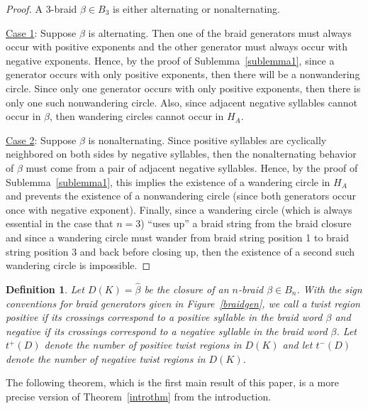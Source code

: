 \documentclass{article}
\newtheorem{definition}{Definition}[section]
\begin{document}
\begin{proof} A 3-braid $\beta \in B_{3}$ is either alternating or nonalternating. 

\bigskip

\noindent \underline{Case 1}: Suppose $\beta$ is alternating. Then one of the braid generators must always occur with positive exponents and the other generator must always occur with negative exponents. Hence, by the proof of Sublemma~\ref{sublemma1}, since a generator occurs with only positive exponents, then there will be a nonwandering circle. Since only one generator occurs with only positive exponents, then there is only one such nonwandering circle. Also, since adjacent negative syllables cannot occur in $\beta$, then wandering circles cannot occur in $H_{A}$. 

\bigskip

\noindent \underline{Case 2}: Suppose $\beta$ is nonalternating. Since positive syllables are cyclically neighbored on both sides by negative syllables, then the nonalternating behavior of $\beta$ must come from a pair of adjacent negative syllables. Hence, by the proof of Sublemma~\ref{sublemma1}, this implies the existence of a wandering circle in $H_{A}$ and prevents the existence of a nonwandering circle (since both generators occur once with negative exponent). Finally, since a wandering circle (which is always essential in the case that $n=3$) ``uses up'' a braid string from the braid closure and since a wandering circle must wander from braid string position 1 to braid string position 3 and back before closing up, then the existence of a second such wandering circle is impossible. 

\end{proof}

\begin{definition}
Let $D(K)=\widehat{\beta}$ be the closure of an $n$-braid $\beta \in B_{n}$. With the sign conventions for braid generators given in Figure~\ref{braidgen}, we call a twist region \emph{positive} if its crossings correspond to a positive syllable in the braid word $\beta$ and \emph{negative} if its crossings correspond to a negative syllable in the braid word $\beta$. Let $t^{+}(D)$ denote the number of positive twist regions in $D(K)$ and let $t^{-}(D)$ denote the number of negative twist regions in $D(K)$.
\end{definition}

The following theorem, which is the first main result of this paper, is a more precise version of Theorem~\ref{introthm} from the introduction. 
\end{document}
